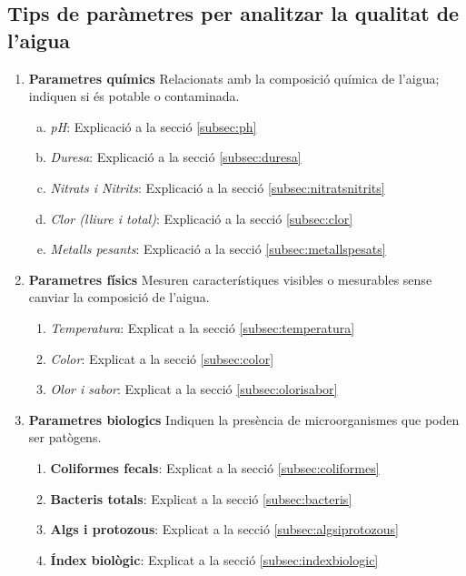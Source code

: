 \subsection{Tips de paràmetres per analitzar la qualitat de l'aigua}
\begin{enumerate}[1)]
 \item \textbf{Parametres químics}
 Relacionats amb la composició química de l’aigua; indiquen si és potable o contaminada.
 \begin{enumerate}[a)]
  \item \textit{pH}: Explicació a la secció \ref{subsec:ph}
  \item \textit{Duresa}: Explicació a la secció  \ref{subsec:duresa}
  \item \textit{Nitrats i Nitrits}: Explicació a la secció  \ref{subsec:nitratsnitrits}
  \item \textit{Clor (lliure i total)}: Explicació a la secció  \ref{subsec:clor}
  \item \textit{Metalls pesants}: Explicació a la secció   \ref{subsec:metallspesats}
 \end{enumerate}
 \item \textbf{Parametres físics}
 Mesuren característiques visibles o mesurables sense canviar la composició de l’aigua.
 \begin{enumerate}
  \item \textit{Temperatura}: Explicat a la secció \ref{subsec:temperatura}
  \item \textit{Color}: Explicat a la secció \ref{subsec:color}
  \item \textit{Olor i sabor}: Explicat a la secció \ref{subsec:olorisabor}
 \end{enumerate}
 \item \textbf{Parametres biologics}
 Indiquen la presència de microorganismes que poden ser patògens.
 \begin{enumerate}
  \item \textbf{Coliformes fecals}: Explicat a la secció \ref{subsec:coliformes}
  \item \textbf{Bacteris totals}: Explicat a la secció \ref{subsec:bacteris}
  \item \textbf{Algs i protozous}: Explicat a la secció \ref{subsec:algsiprotozous}
  \item \textbf{Índex biològic}: Explicat a la secció \ref{subsec:indexbiologic}

 \end{enumerate}

\end{enumerate}


